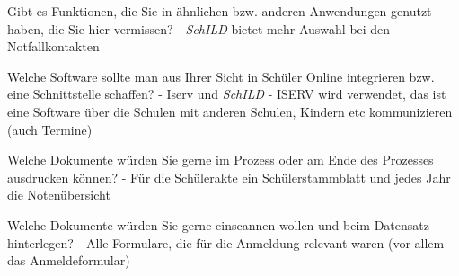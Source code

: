 Gibt es Funktionen, die Sie in ähnlichen bzw. anderen Anwendungen genutzt haben, die Sie hier vermissen?
- \textit{SchILD}  bietet mehr Auswahl bei den Notfallkontakten			






Welche Software sollte man aus Ihrer Sicht in Schüler Online integrieren bzw. eine Schnittstelle schaffen? 	
- Iserv und  \textit{SchILD} 			
- ISERV wird verwendet, das ist eine Software über die Schulen mit anderen Schulen, Kindern etc kommunizieren (auch Termine)



Welche Dokumente würden Sie gerne im Prozess oder am Ende des Prozesses ausdrucken können?	
- Für die Schülerakte ein Schülerstammblatt und jedes Jahr die Notenübersicht			

Welche Dokumente würden Sie gerne einscannen wollen und beim Datensatz hinterlegen?	
- Alle Formulare, die für die Anmeldung relevant waren (vor allem das Anmeldeformular)			